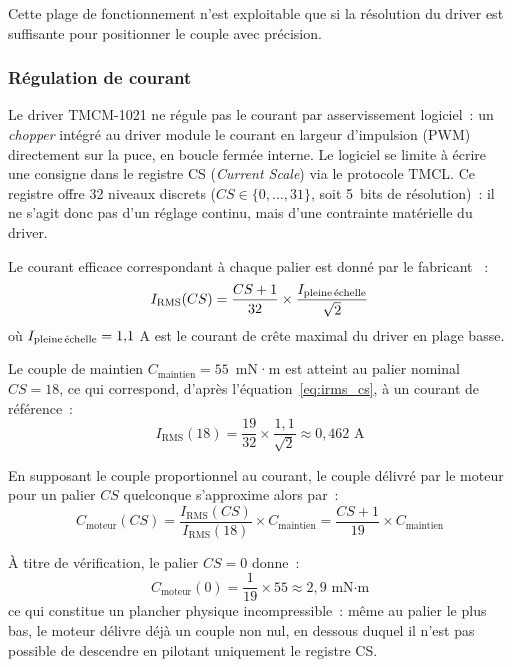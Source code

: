 Cette plage de fonctionnement n'est exploitable que si la résolution du driver est suffisante pour positionner le couple avec précision.

\subsubsection{Régulation de courant}

Le driver TMCM-1021 ne régule pas le courant par asservissement logiciel~:
un \emph{chopper} intégré au driver module le courant en largeur
d'impulsion (PWM) directement sur la puce, en boucle fermée interne. Le
logiciel se limite à écrire une consigne dans le registre CS
(\emph{Current Scale}) via le protocole TMCL. Ce registre offre 32 niveaux
discrets ($CS \in \{0, \ldots, 31\}$, soit 5~bits de résolution)~: il ne
s'agit donc pas d'un réglage continu, mais d'une contrainte matérielle du
driver.

Le courant efficace correspondant à chaque palier est donné par le
fabricant \cite{trinamic_tmcm_1021}~:
\begin{equation}
    I_{\text{RMS}}(CS) = \frac{CS+1}{32} \times \frac{I_{\text{pleine\,échelle}}}{\sqrt{2}}
    \label{eq:irms_cs}
\end{equation}
\noindent où $I_{\text{pleine\,échelle}} = 1{,}1$ A est le courant de crête
maximal du driver en plage basse.

Le couple de maintien $C_{\text{maintien}} = 55$~mN·m est atteint au palier
nominal $CS = 18$, ce qui correspond, d'après l'équation~\eqref{eq:irms_cs},
à un courant de référence~:
\begin{equation}
    I_{\text{RMS}}(18) = \frac{19}{32} \times \frac{1{,}1}{\sqrt{2}} \approx 0{,}462 \text{ A}
    \label{eq:irms_18}
\end{equation}

En supposant le couple proportionnel au courant, le couple délivré par le
moteur pour un palier $CS$ quelconque s'approxime alors par~:
\begin{equation}
    C_{\text{moteur}}(CS) = \frac{I_{\text{RMS}}(CS)}{I_{\text{RMS}}(18)} \times C_{\text{maintien}}
    = \frac{CS+1}{19} \times C_{\text{maintien}}
    \label{eq:couple_moteur_cs}
\end{equation}

À titre de vérification, le palier $CS = 0$ donne~:
\begin{equation}
    C_{\text{moteur}}(0) = \frac{1}{19} \times 55 \approx 2{,}9 \text{ mN·m}
    \label{eq:couple_moteur_cs0}
\end{equation}
\noindent ce qui constitue un plancher physique incompressible~: même au
palier le plus bas, le moteur délivre déjà un couple non nul, en dessous
duquel il n'est pas possible de descendre en pilotant uniquement le
registre CS.

